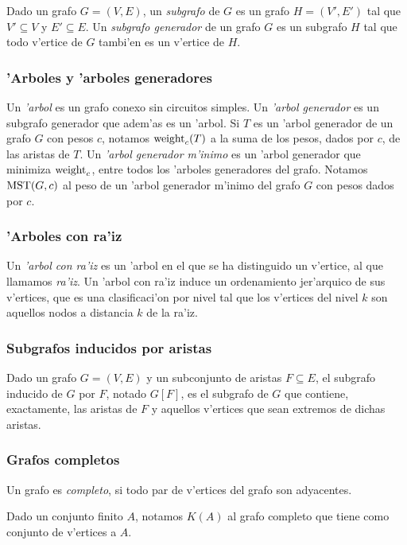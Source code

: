 Dado un grafo $G = (V, E)$, un \textit{subgrafo} de $G$ es un grafo $H = (V', E')$ tal que $V' \subseteq V$ y $E' \subseteq E$. Un \textit{subgrafo generador} de un grafo $G$ es un subgrafo $H$ tal que todo v'ertice de $G$ tambi'en es un v'ertice de $H$.

\subsubsection*{'Arboles y 'arboles generadores}

Un \textit{'arbol} es un grafo conexo sin circuitos simples. Un \textit{'arbol generador} es un subgrafo generador que adem'as es un 'arbol. Si $T$ es un 'arbol generador de un grafo $G$ con pesos $c$, notamos $\textnormal{weight}_c(T)$ a la suma de los pesos, dados por $c$, de las aristas de $T$. Un \textit{'arbol generador m'inimo} es un 'arbol generador que minimiza $\textnormal{weight}_c$, entre todos los 'arboles generadores del grafo. Notamos $\textnormal{MST}(G, c)$ al peso de un 'arbol generador m'inimo del grafo $G$ con pesos dados por $c$.

\subsubsection*{'Arboles con ra'iz}

Un \textit{'arbol con ra'iz} es un 'arbol en el que se ha distinguido un v'ertice, al que llamamos \textit{ra'iz}. Un 'arbol con ra'iz induce un ordenamiento jer'arquico de sus v'ertices, que es una clasificaci'on por nivel tal que los v'ertices del nivel $k$ son aquellos nodos a distancia $k$ de la ra'iz.

\subsubsection*{Subgrafos inducidos por aristas}

Dado un grafo $G = (V, E)$ y un subconjunto de aristas $F \subseteq E$, el subgrafo inducido de $G$ por $F$, notado $G[F]$, es el subgrafo de $G$ que contiene, exactamente, las aristas de $F$ y aquellos v'ertices que sean extremos de dichas aristas.

\subsubsection*{Grafos completos}

Un grafo es \textit{completo}, si todo par de v'ertices del grafo son adyacentes. 

Dado un conjunto finito $A$, notamos $K(A)$ al grafo completo que tiene como conjunto de v'ertices a $A$.

